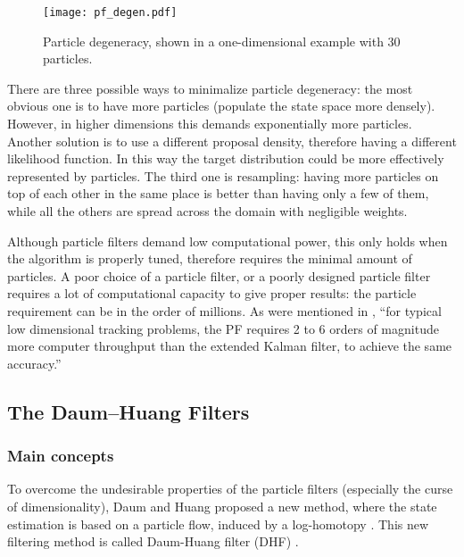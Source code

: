 \begin{figure}[htb!]
  \centering
  \texttt{[image: pf\_degen.pdf]}
  \caption{Particle degeneracy, shown in a one-dimensional example with 30 particles.}
  \label{fig:pf-degen}
\end{figure}
There are three possible ways to minimalize particle degeneracy: the most obvious one is to have more particles (populate the state space more densely). However, in higher dimensions this demands exponentially more particles. Another solution is to use a different proposal density, therefore having a different likelihood function. In this way the target distribution could be more effectively represented by particles. The third one is resampling: having more particles on top of each other in the same place is better than having only a few of them, while all the others are spread across the domain with negligible weights.


Although particle filters demand low computational power, this only holds when the algorithm is properly tuned, therefore requires the minimal amount of particles. A poor choice of a particle filter, or a poorly designed particle filter requires a lot of computational capacity to give proper results: the particle requirement can be in the order of millions. As were mentioned in \cite{Daum2003}, ``for typical low dimensional tracking problems, the PF requires 2 to 6 orders of magnitude more computer throughput than the extended Kalman filter, to achieve the same accuracy.''

\subsection{The Daum--Huang Filters}
\subsubsection{Main concepts}
To overcome the  undesirable properties of the particle filters (especially the curse of dimensionality), Daum and Huang proposed a new method, where the state estimation is based on a particle flow, induced by a log-homotopy \cite{Daum2007}. This new filtering method is called Daum-Huang filter (DHF) \cite{Choi2011}.

